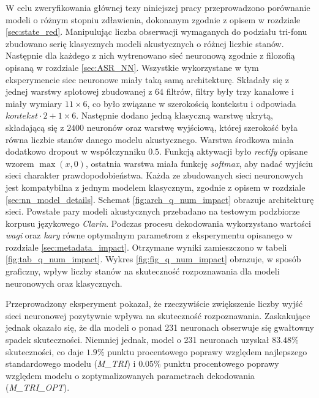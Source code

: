 \documentclass[shortabstract, mgr]{iithesis}
\begin{document}
		W celu zweryfikowania głównej tezy niniejszej pracy przeprowadzono porównanie modeli o różnym stopniu zdławienia, dokonanym zgodnie z opisem w rozdziale \ref{sec:state_red}. Manipulując liczba obserwacji wymaganych do podziału tri-fonu zbudowano serię klasycznych modeli akustycznych o różnej liczbie stanów. Następnie dla każdego z nich wytrenowano sieć neuronową zgodnie z filozofią opisaną w rozdziale \ref{sec:ASR_NN}. Wszystkie wykorzystane w tym eksperymencie siec neuronowe miały taką samą architekturę. Składały się z jednej warstwy splotowej zbudowanej z $64$ filtrów, filtry były trzy kanałowe i miały wymiary $11\times6$, co było związane w szerokością kontekstu i odpowiada $kontekst \cdot 2 + 1\times6$. Następnie dodano jedną klasyczną warstwę ukrytą, składającą się z $2400$ neuronów oraz warstwę wyjściową, której szerokość była równa liczbie stanów danego modelu akustycznego. Warstwa środkowa miała dodatkowo dropout w współczynniku $0.5$. Funkcją aktywacji było \textit{rectify} opisane wzorem $\max(x,0)$, ostatnia warstwa miała funkcję \textit{softmax}, aby nadać wyjściu sieci charakter prawdopodobieństwa. Każda ze zbudowanych sieci neuronowych jest kompatybilna z jednym modelem klasycznym, zgodnie z opisem w rozdziale \ref{sec:nn_model_details}. Schemat \ref{fig:arch_q_num_impact} obrazuje architekturę sieci. Powstałe pary modeli akustycznych przebadano na testowym podzbiorze korpusu językowego \textit{Clarin}. Podczas procesu dekodowania wykorzystano wartości \textit{wagi} oraz \textit{kary} równe optymalnym parametrom z eksperymentu opisanego w rozdziale \ref{sec:metadata_impact}. Otrzymane wyniki zamieszczono w tabeli \ref{fig:tab_q_num_impact}. Wykres \ref{fig:fig_q_num_impact} obrazuje, w sposób graficzny, wpływ liczby stanów na skuteczność rozpoznawania dla modeli neuronowych oraz klasycznych.
		
		Przeprowadzony eksperyment pokazał, że rzeczywiście zwiększenie liczby wyjść sieci neuronowej pozytywnie wpływa na skuteczność rozpoznawania. Zaskakujące jednak okazało się, że dla modeli o ponad 231 neuronach obserwuje się gwałtowny spadek skuteczności. Niemniej jednak, model o 231 neuronach uzyskał  $83.48\%$ skuteczności, co daje $1.9\%$ punktu procentowego poprawy względem najlepszego standardowego modelu (\textit{M\_TRI}) i $0.05\%$ punktu procentowego poprawy względem modelu o zoptymalizowanych parametrach dekodowania (\textit{M\_TRI\_OPT}). 
		
\end{document}

